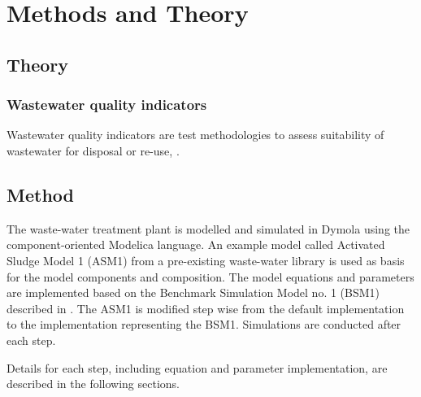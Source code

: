 \section{Methods and Theory}\label{sec:METHODS}

\subsection{Theory}
\subsubsection{Wastewater quality indicators}
Wastewater quality indicators are test methodologies to assess suitability of wastewater for disposal or re-use, \cite{qi}.

\subsection{Method}
The waste-water treatment plant is modelled and simulated in Dymola using the component-oriented Modelica language. An example model called Activated Sludge Model 1 (ASM1) from a pre-existing waste-water library is used as basis for the model components and composition. The model equations and parameters are implemented based on the Benchmark Simulation Model no. 1 (BSM1) described in \cite{alex2008}. The ASM1 is modified step wise from the default implementation to the implementation representing the BSM1. Simulations are conducted after each step.

Details for each step, including equation and parameter implementation, are described in the following sections.